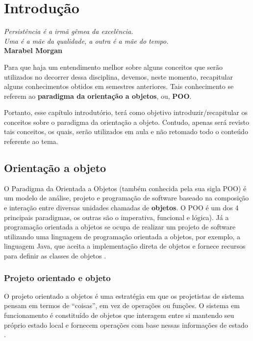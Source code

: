 \chapter{Introdução}\label{cap:cap1}

\begin{flushright}
  \textit{
    Persistência é a irmã gêmea da excelência. \\
    Uma é a mãe da qualidade, a outra é a mãe do tempo.
  } \\
  
  \textbf{Marabel Morgan}
\end{flushright}


Para que haja um entendimento melhor sobre alguns conceitos que serão utilizados no decorrer dessa disciplina, devemos, neste momento, recapitular alguns conhecimentos obtidos em semestres anteriores. Tais conhecimento se referem ao \textbf{paradigma da orientação a objetos}, ou, \textbf{POO}. 

Portanto, esse capítulo introdutório, terá como objetivo introduzir/recapitular os conceitos sobre o paradigma da orientação a objeto. Contudo, apenas será revisto tais conceitos, os quais, serão utilizados em aula e não retomado todo o conteúdo referente ao tema.

\section{Orientação a objeto}

O Paradigma da Orientada a Objetos (também conhecida pela sua sigla POO) é um 
modelo de análise, projeto e programação de software baseado na composição e 
interação entre diversas unidades chamadas de \textbf{objetos}. O POO é um dos 4 
principais paradigmas, os outras são o imperativa,  funcional e lógica). Já a programação orientada a objetos se ocupa de realizar um projeto de software utilizando uma linguagem de programação orientada a objetos, por exemplo, a linguagem Java, que aceita a implementação direta de objetos e fornece recursos para definir as classes de objetos \cite{sommerville2003engenharia}.

\subsection{Projeto orientado e objeto}

O projeto orientado a objetos é uma estratégia em que os projetistas de sistema pensam em termos de ``coisas'', em vez de operações ou funções. O sistema em funcionamento é constituído de objetos que interagem entre si mantendo seu próprio estado local e fornecem operações com base nessas informações de estado \cite{sommerville2003engenharia}.

